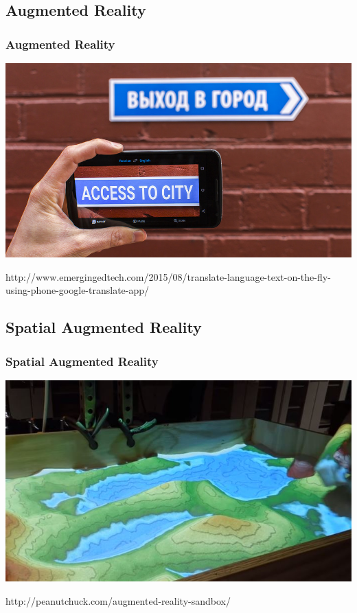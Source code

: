 \documentclass{beamer}
\begin{document}
\subsection{Augmented Reality}
\begin{frame}
	\frametitle{Augmented Reality}
	\includegraphics[width=\textwidth]{images/google-translate}
	\begin{center}
	\Tiny http://www.emergingedtech.com/2015/08/translate-language-text-on-the-fly-using-phone-google-translate-app/
	\end{center}
\end{frame}

\subsection{Spatial Augmented Reality}
\begin{frame}
	\frametitle{Spatial Augmented Reality}
	\includegraphics[width=\textwidth]{images/Augmented-Reality-Sandbox}
	\begin{center}
	\tiny http://peanutchuck.com/augmented-reality-sandbox/
	\end{center}
\end{frame}
\end{document}
